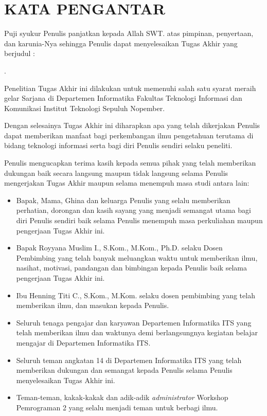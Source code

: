 \chapter{KATA PENGANTAR}

\indent\indent Puji syukur Penulis panjatkan kepada Allah SWT. atas pimpinan, penyertaan, dan karunia-Nya sehingga Penulis dapat menyelesaikan Tugas Akhir yang berjudul :
\begin{center}
	\textbf{\MakeUppercase{\judul}}.
\end{center}

Penelitian Tugas Akhir ini dilakukan untuk memenuhi salah satu syarat meraih gelar Sarjana di Departemen Informatika Fakultas Teknologi Informasi dan Komunikasi Institut Teknologi Sepuluh Nopember.

Dengan selesainya Tugas Akhir ini diharapkan apa yang telah dikerjakan Penulis dapat memberikan manfaat bagi perkembangan ilmu pengetahuan terutama di bidang teknologi informasi serta bagi diri Penulis sendiri selaku peneliti.

Penulis mengucapkan terima kasih kepada semua pihak yang telah memberikan dukungan baik secara langsung maupun tidak langsung selama Penulis mengerjakan Tugas Akhir maupun selama menempuh masa studi antara lain:

\begin{itemize}
	\item Bapak, Mama, Ghina dan keluarga Penulis yang selalu memberikan perhatian, dorongan dan kasih sayang yang menjadi semangat utama bagi diri Penulis sendiri baik selama Penulis menempuh masa perkuliahan maupun pengerjaan Tugas Akhir ini.
	\item Bapak Royyana Muslim I., S.Kom., M.Kom., Ph.D. selaku Dosen Pembimbing yang telah banyak meluangkan waktu untuk memberikan ilmu, nasihat, motivasi, pandangan dan bimbingan kepada Penulis baik selama pengerjaan Tugas Akhir ini.
	\item Ibu Henning Titi C., S.Kom., M.Kom. selaku dosen pembimbing yang telah memberikan ilmu, dan masukan kepada Penulis.
	\item Seluruh tenaga pengajar dan karyawan Departemen Informatika ITS yang telah memberikan ilmu dan waktunya demi berlangsungnya kegiatan belajar mengajar di Departemen Informatika ITS.
	\item Seluruh teman angkatan 14 di Departemen Informatika ITS yang telah memberikan dukungan dan semangat kepada Penulis selama Penulis menyelesaikan Tugas Akhir ini.
	\item Teman-teman, kakak-kakak dan adik-adik \textit{administrator} Workshop Pemrograman 2 yang selalu menjadi teman untuk berbagi ilmu.
\end{itemize}

